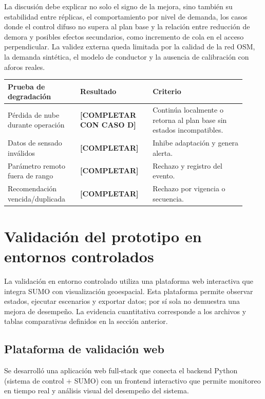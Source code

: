 \documentclass[12pt,a4paper,oneside]{report}
\begin{document}
La discusión debe explicar no solo el signo de la mejora, sino también su estabilidad entre réplicas, el comportamiento por nivel de demanda, los casos donde el control difuso no supera al plan base y la relación entre reducción de demora y posibles efectos secundarios, como incremento de cola en el acceso perpendicular. La validez externa queda limitada por la calidad de la red OSM, la demanda sintética, el modelo de conductor y la ausencia de calibración con aforos reales.

\begin{longtable}{@{}p{0.28\linewidth}p{0.28\linewidth}p{0.36\linewidth}@{}}
\toprule
\textbf{Prueba de degradación} & \textbf{Resultado} & \textbf{Criterio}\\
\midrule
\endhead
Pérdida de nube durante operación & \textbf{[COMPLETAR CON CASO D]} & Continúa localmente o retorna al plan base sin estados incompatibles.\\
Datos de sensado inválidos & \textbf{[COMPLETAR]} & Inhibe adaptación y genera alerta.\\
Parámetro remoto fuera de rango & \textbf{[COMPLETAR]} & Rechazo y registro del evento.\\
Recomendación vencida/duplicada & \textbf{[COMPLETAR]} & Rechazo por vigencia o secuencia.\\
\bottomrule
\end{longtable}

\section{Validación del prototipo en entornos controlados}\label{validaciuxf3n-del-prototipo-en-entornos-controlados}

La validación en entorno controlado utiliza una plataforma web interactiva que integra SUMO con visualización geoespacial. Esta plataforma permite observar estados, ejecutar escenarios y exportar datos; por sí sola no demuestra una mejora de desempeño. La evidencia cuantitativa corresponde a los archivos y tablas comparativas definidos en la sección anterior.

\subsection{Plataforma de validación web}\label{plataforma-de-validaciuxf3n-web}

Se desarrolló una aplicación web full-stack que conecta el backend Python (sistema de control + SUMO) con un frontend interactivo que permite monitoreo en tiempo real y análisis visual del desempeño del sistema.
\end{document}
